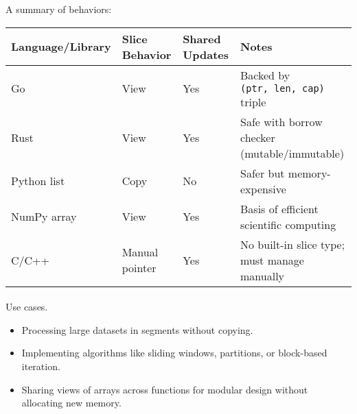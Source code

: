 \documentclass[
  letterpaper,
  DIV=11,
  numbers=noendperiod]{scrreprt}
\makeatletter
\let\oldparagraph\paragraph
\renewcommand{\paragraph}{
    \@ifstar
      \xxxParagraphStar
      \xxxParagraphNoStar
  }
\newcommand{\xxxParagraphStar}[1]{\oldparagraph*{#1}\mbox{}}
\newcommand{\xxxParagraphNoStar}[1]{\oldparagraph{#1}\mbox{}}
\providecommand{\tightlist}{%
  \setlength{\itemsep}{0pt}\setlength{\parskip}{0pt}}
\makeatother
\begin{document}
A summary of behaviors:

\begin{longtable}[]{@{}
  >{\raggedright\arraybackslash}p{}
  >{\raggedright\arraybackslash}p{}
  >{\raggedright\arraybackslash}p{}
  >{\raggedright\arraybackslash}p{}@{}}
\toprule\noalign{}
\begin{minipage}[b]{\linewidth}\raggedright
Language/Library
\end{minipage} & \begin{minipage}[b]{\linewidth}\raggedright
Slice Behavior
\end{minipage} & \begin{minipage}[b]{\linewidth}\raggedright
Shared Updates
\end{minipage} & \begin{minipage}[b]{\linewidth}\raggedright
Notes
\end{minipage} \\
\midrule\noalign{}
\endhead
\bottomrule\noalign{}
\endlastfoot
Go & View & Yes & Backed by \texttt{(ptr,\ len,\ cap)} triple \\
Rust & View & Yes & Safe with borrow checker (mutable/immutable) \\
Python list & Copy & No & Safer but memory-expensive \\
NumPy array & View & Yes & Basis of efficient scientific computing \\
C/C++ & Manual pointer & Yes & No built-in slice type; must manage
manually \\
\end{longtable}

\paragraph{Use cases.}\label{use-cases.-2}

\begin{itemize}
\tightlist
\item
  Processing large datasets in segments without copying.
\item
  Implementing algorithms like sliding windows, partitions, or
  block-based iteration.
\item
  Sharing views of arrays across functions for modular design without
  allocating new memory.
\end{itemize}
\end{document}
